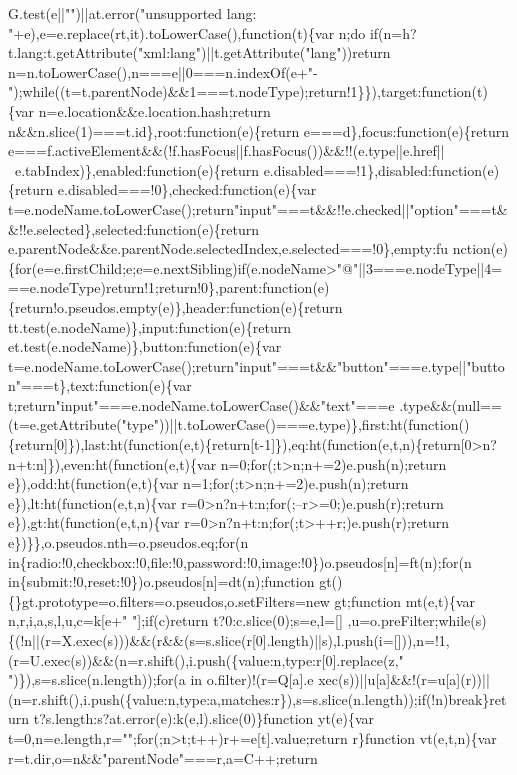 \begin{DoxyCode}
{       G.test(e||"")||at.error("unsupported lang: "+e),e=e.replace(rt,it).toLowerCase(),function(t)\{var n;do
       if(n=h?t.lang:t.getAttribute("xml:lang")||t.getAttribute("lang"))return
       n=n.toLowerCase(),n===e||0===n.indexOf(e+"-");while((t=t.parentNode)&&1===t.nodeType);return!1\}\}),target:function(t)\{var n=e.location&&e.location.hash;return
       n&&n.slice(1)===t.id\},root:function(e)\{return e===d\},focus:function(e)\{return
       e===f.activeElement&&(!f.hasFocus||f.hasFocus())&&!!(e.type||e.href||~e.tabIndex)\},enabled:function(e)\{return e.disabled===!1\},disabled:function(e)\{return
       e.disabled===!0\},checked:function(e)\{var
       t=e.nodeName.toLowerCase();return"input"===t&&!!e.checked||"option"===t&&!!e.selected\},selected:function(e)\{return
       e.parentNode&&e.parentNode.selectedIndex,e.selected===!0\},empty:fu
      nction(e)\{for(e=e.firstChild;e;e=e.nextSibling)if(e.nodeName>"@"||3===e.nodeType||4===e.nodeType)return!1;return!0\},parent:function(e)\{return!o.pseudos.empty(e)\},header:function(e)\{return
       tt.test(e.nodeName)\},input:function(e)\{return et.test(e.nodeName)\},button:function(e)\{var
       t=e.nodeName.toLowerCase();return"input"===t&&"button"===e.type||"button"===t\},text:function(e)\{var
       t;return"input"===e.nodeName.toLowerCase()&&"text"===e
      .type&&(null==(t=e.getAttribute("type"))||t.toLowerCase()===e.type)\},first:ht(function()\{return[0]\}),last:ht(function(e,t)\{return[t-1]\}),eq:ht(function(e,t,n)\{return[0>n?n+t:n]\}),even:ht(function(e,t)\{var
       n=0;for(;t>n;n+=2)e.push(n);return e\}),odd:ht(function(e,t)\{var n=1;for(;t>n;n+=2)e.push(n);return
       e\}),lt:ht(function(e,t,n)\{var r=0>n?n+t:n;for(;--r>=0;)e.push(r);return e\}),gt:ht(function(e,t,n)\{var
       r=0>n?n+t:n;for(;t>++r;)e.push(r);return e\})\}\},o.pseudos.nth=o.pseudos.eq;for(n
       in\{radio:!0,checkbox:!0,file:!0,password:!0,image:!0\})o.pseudos[n]=ft(n);for(n in\{submit:!0,reset:!0\})o.pseudos[n]=dt(n);function
       gt()\{\}gt.prototype=o.filters=o.pseudos,o.setFilters=new gt;function mt(e,t)\{var n,r,i,a,s,l,u,c=k[e+" "];if(c)return
       t?0:c.slice(0);s=e,l=[]
      ,u=o.preFilter;while(s)\{(!n||(r=X.exec(s)))&&(r&&(s=s.slice(r[0].length)||s),l.push(i=[])),n=!1,(r=U.exec(s))&&(n=r.shift(),i.push(\{value:n,type:r[0].replace(z," ")\}),s=s.slice(n.length));for(a in
       o.filter)!(r=Q[a].e
      xec(s))||u[a]&&!(r=u[a](r))||(n=r.shift(),i.push(\{value:n,type:a,matches:r\}),s=s.slice(n.length));if(!n)break\}return t?s.length:s?at.error(e):k(e,l).slice(0)\}function yt(e)\{var
       t=0,n=e.length,r="";for(;n>t;t++)r+=e[t].value;return r\}function vt(e,t,n)\{var r=t.dir,o=n&&"parentNode"===r,a=C++;return
}
\end{DoxyCode}
